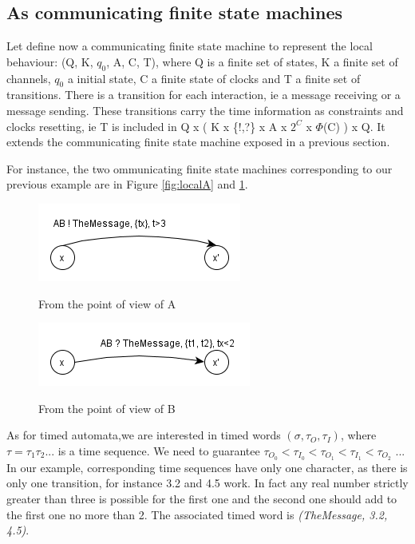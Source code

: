 \documentclass[a4paper,11pt,twoside]{report}
\begin{document}
\subsection{As communicating finite state machines}
Let define now a communicating finite state machine to represent the local behaviour: (Q, K, $q_0$, A, C, T), where Q is a finite set of states, K a finite set of channels, $q_0$ a initial state, C a finite state of clocks and T a finite set of transitions. There is a transition for each interaction, ie a message receiving or a message sending. These transitions carry the time information as constraints and  clocks resetting, ie T is included in Q x ( K x \{!,?\} x A x $2^C$ x $\Phi$(C) ) x Q. It extends the communicating finite state machine exposed in a previous section.

For instance, the two ommunicating finite state machines corresponding to our previous example are in Figure \ref{fig:localA} and \ref{fig:localB}.
\begin{figure}[h]
\begin{center}
\includegraphics[scale=0.7]{localA}\caption{From the point of view of A}\label{fig:localA}
\includegraphics[scale=0.7]{localB}\caption{From the point of view of B}\label{fig:localB}
\end{center}
\end{figure}

As for timed automata,we are interested in timed words $(\sigma,\tau_O, \tau_I)$, where $\tau = \tau_{1}\tau_{2}...$ is a time sequence. We need to guarantee $\tau_{O_0} < \tau_{I_0} < \tau_{O_1} < \tau_{I_1} < \tau_{O_2}$ ... In our example, corresponding time sequences have only one character, as there is only one transition, for instance 3.2 and 4.5 work. In fact any real number strictly greater than three is possible for the first one and the second one should add to the first one no more than 2. The associated timed word is \emph{(TheMessage, 3.2, 4.5)}.
\end{document}
